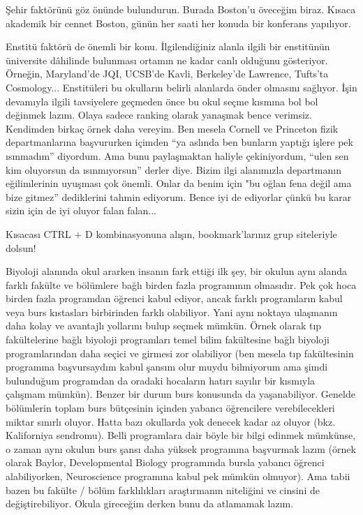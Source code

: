 \documentclass[12pt]{article}
\theoremstyle{break}
\begin{document}
Şehir faktörünü göz önünde bulundurun. Burada Boston’u öveceğim biraz. Kısaca akademik bir cennet Boston, günün her saati her konuda bir konferans yapılıyor.

Enstitü faktörü de önemli bir konu. İlgilendiğiniz alanla ilgili bir enstitünün üniversite dâhilinde bulunması ortamın ne kadar canlı olduğunu gösteriyor. Örneğin, Maryland’de JQI, UCSB’de Kavli, Berkeley’de Lawrence, Tufts’ta Cosmology... Enstitüleri bu okulların belirli alanlarda önder olmasını sağlıyor. İşin devamıyla ilgili tavsiyelere geçmeden önce bu okul seçme kısmına bol bol değinmek lazım. Olaya sadece ranking olarak yanaşmak bence verimsiz. Kendimden birkaç örnek daha vereyim. Ben mesela Cornell ve Princeton fizik departmanlarına başvururken içimden “ya aslında ben bunların yaptığı işlere pek ısınmadım” diyordum. Ama bunu paylaşmaktan haliyle çekiniyordum, “ulen sen kim oluyorsun da ısınmıyorsun” derler diye. Bizim ilgi alanımızla departmanın eğilimlerinin uyuşması çok önemli. Onlar da benim için "bu oğlan fena değil ama bize gitmez” dediklerini tahmin ediyorum. Bence iyi de ediyorlar çünkü bu karar sizin için de iyi oluyor falan falan...

Kısacası CTRL + D kombinasyonuna alışın, bookmark’larınız grup siteleriyle dolsun!

Biyoloji alanında okul ararken insanın fark ettiği ilk şey, bir okulun aynı alanda farklı fakülte ve bölümlere bağlı birden fazla programının olmasıdır. Pek çok hoca birden fazla programdan öğrenci kabul ediyor, ancak farklı programların kabul veya burs kıstasları birbirinden farklı olabiliyor. Yani aynı noktaya ulaşmanın daha kolay ve avantajlı yollarını bulup seçmek mümkün. Örnek olarak tıp fakültelerine bağlı biyoloji programları temel bilim fakültesine bağlı biyoloji programlarından daha seçici ve girmesi zor olabiliyor (ben mesela tıp fakültesinin programına başvursaydım kabul şansım olur muydu bilmiyorum ama şimdi bulunduğum programdan da oradaki hocaların hatırı sayılır bir kısmıyla çalışmam mümkün). Benzer bir durum burs konusunda da yaşanabiliyor. Genelde bölümlerin toplam burs bütçesinin içinden yabancı öğrencilere verebilecekleri miktar sınırlı oluyor. Hatta bazı okullarda yok denecek kadar az oluyor (bkz. Kaliforniya sendromu). Belli programlara dair böyle bir bilgi edinmek mümkünse, o zaman aynı okulun burs şansı daha yüksek programına başvurmak lazım (örnek olarak Baylor, Developmental Biology programında bursla yabancı öğrenci alabiliyorken, Neuroscience programına kabul pek mümkün olmuyor). Ama tabii bazen bu fakülte / bölüm farklılıkları araştırmanın niteliğini ve cinsini de değiştirebiliyor. Okula gireceğim derken bunu da atlamamak lazım.
\end{document}
